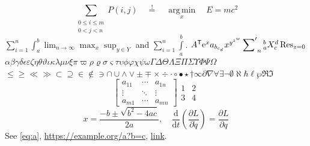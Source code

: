 \[ \sum_{\substack{0\le i\le m\\ 0<j<n}} P(i,j) \quad \overset{!}{=} \quad \underset{x}{\operatorname{arg\,min}} \quad \boxed{E=mc^2} \]
$\sum_{i=1}^n \int_a^b \lim_{n\to\infty} \max_{x} \sup_{y\in Y}$ and $\displaystyle\sum_{i=1}^n \int\limits_a^b$.
$A^{\mathsf T} \mathrm{e}^{x} a_{b_{c_{d}}} x^{y^{z^{w}}} \sideset{}{'}\sum_{n} {}_{a}^{b}X_{c}^{d} \mathop{\mathrm{Res}}_{z=0}$
$\alpha\beta\gamma\delta\epsilon\varepsilon\zeta\eta\theta\vartheta\iota\kappa\lambda\mu\nu\xi\pi\varpi\rho\varrho\sigma\varsigma\tau\upsilon\phi\varphi\chi\psi\omega\Gamma\Delta\Theta\Lambda\Xi\Pi\Sigma\Upsilon\Phi\Psi\Omega$
$\leq\geq\ll\gg\subset\supseteq\in\notin\ni\cap\cup\wedge\vee\pm\mp\times\div\cdot\circ\bullet\star\dagger\infty\partial\nabla\forall\exists\neg\emptyset\aleph\hbar\ell\wp\Re\Im$
\[ \begin{bmatrix} a_{11} & \cdots & a_{1n} \\ \vdots & \ddots & \vdots \\ a_{m1} & \cdots & a_{mn} \end{bmatrix} \begin{array}{c|c} 1 & 2 \\ \hline 3 & 4 \end{array} \]
\[ x = \frac{-b \pm \sqrt{b^2-4ac}}{2a}, \quad \frac{\mathrm{d}}{\mathrm{d}t}\left(\frac{\partial L}{\partial \dot q}\right) = \frac{\partial L}{\partial q} \]
See \eqref{eq:a}, \url{https://example.org/a?b=c}, \href{https://x.y}{link}.
